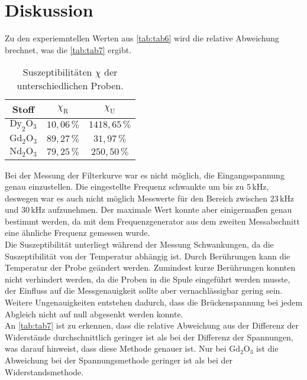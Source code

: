 \section{Diskussion}
\label{sec:Diskussion}

Zu den experiemntellen Werten aus \autoref{tab:tab6} wird die relative Abweichung brechnet, was die \autoref{tab:tab7} ergibt.

\begin{table}[H]
    \centering
    \caption{Suszeptibilitäten $\chi$ der unterschiedlichen Proben.}
    \label{tab:tab7}
    \begin{tabular}{S S S}
      \toprule
       {Stoff} & {$\chi_{\text{R}}$} & {$\chi_{\text{U}}$}  \\
      \midrule
      {$\text{Dy}_2\text{O}_3$}  &{$10,06 \, \%$}    &{$ 1418,65 \, \%$}\\
      {$\text{Gd}_2\text{O}_3$}  &{$89,27 \, \%$}    &{$ 31,97 \, \%$}\\
      {$\text{Nd}_2\text{O}_3$}  &{$79,25 \, \%$}    &{$ 250,50 \, \%$}\\
      \bottomrule
    \end{tabular}
\end{table}

Bei der Messung der Filterkurve war es nicht möglich, die Eingangsspannung genau einzustellen. 
Die eingestellte Frequenz schwankte um bis zu $ 5 \, \unit{\kilo\hertz}$, deswegen war es auch nicht möglich Messwerte für den Bereich zwischen $ 23 \, \unit{\kilo\hertz} $ und $ 30 \, \unit{\kilo\hertz} $  aufzunehmen.
Der maximale Wert konnte aber einigermaßen genau bestimmt werden, da mit dem Frequenzgenerator aus dem zweiten Messabschnitt eine ähnliche Frequenz gemessen wurde. \\

Die Suszeptibilität unterliegt während der Messung Schwankungen, da die Suszeptibilität von der Temperatur abhängig ist. 
Durch Berührungen kann die Temperatur der Probe geändert werden. 
Zumindest kurze Berührungen konnten nicht verhindert werden, da die Proben in die Spule eingeführt werden musste, der Einfluss auf die Messgenauigkeit sollte aber vernachlässigbar gering sein. \\
Weitere Ungenauigkeiten entstehen  dadurch, dass die Brückenspannung bei jedem Abgleich nicht auf null abgesenkt werden konnte. \\

An \autoref{tab:tab7} ist zu erkennen, dass die relative Abweichung aus der Differenz der Widerstände durchschnittlich geringer ist als bei der Differenz der Spannungen, was darauf hinweist, dass diese Methode genauer ist.
Nur bei $\text{Gd}_2\text{O}_3$ ist die Abweichung bei der Spannungsmethode geringer ist als bei der Widerstandsmethode.
